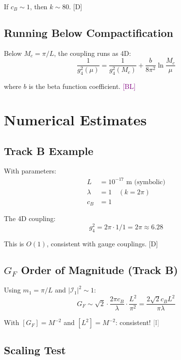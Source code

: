 \documentclass[11pt,a4paper]{article}
\newcommand{\tagD}{\textcolor{blue!70!black}{[D]}}
\newcommand{\tagI}{\textcolor{gray}{[I]}}
\newcommand{\tagBL}{\textcolor{purple}{[BL]}}
\begin{document}
If $c_B \sim 1$, then $k \sim 80$. \tagD

\subsection{Running Below Compactification}

Below $M_c = \pi/L$, the coupling runs as 4D:
\begin{equation}
\label{eq:app-running}
\frac{1}{g_4^2(\mu)} = \frac{1}{g_4^2(M_c)} + \frac{b}{8\pi^2} \ln\frac{M_c}{\mu}
\end{equation}

where $b$ is the beta function coefficient. \tagBL

\section{Numerical Estimates}
\label{app:numeric}

\subsection{Track B Example}

With parameters:
\begin{align}
\label{eq:app-params}
L &= 10^{-17} \text{ m (symbolic)} \\
\lambda &= 1 \quad (k = 2\pi) \\
c_B &= 1
\end{align}

The 4D coupling:
\begin{equation}
\label{eq:app-g4-example}
g_4^2 = 2\pi \cdot 1 / 1 = 2\pi \approx 6.28
\end{equation}

This is $O(1)$, consistent with gauge couplings. \tagD

\subsection{$G_F$ Order of Magnitude (Track B)}

Using $m_1 = \pi/L$ and $|\mathcal{I}_1|^2 \sim 1$:
\begin{equation}
\label{eq:app-GF-oom}
G_F \sim \sqrt{2} \cdot \frac{2\pi c_B}{\lambda} \cdot \frac{L^2}{\pi^2} = \frac{2\sqrt{2} c_B L^2}{\pi \lambda}
\end{equation}

With $[G_F] = M^{-2}$ and $[L^2] = M^{-2}$: consistent! \tagI

\subsection{Scaling Test}
\end{document}
